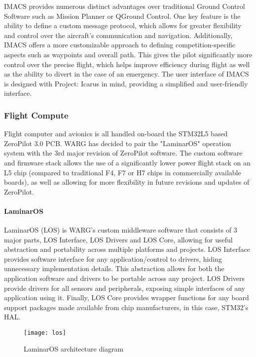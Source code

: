IMACS provides numerous distinct advantages over traditional Ground Control Software
such as Mission Planner or QGround Control. One key feature is the ability to define
a custom message protocol, which allows for greater flexibility and control over the
aircraft's communication and navigation. Additionally, IMACS offers a more customizable
approach to defining competition-specific aspects such as waypoints and overall path.
This gives the pilot significantly more control over the precise flight, which helps
improve efficiency during flight as well as the ability to divert in the case of
an emergency. The user interface of IMACS is designed with Project: Icarus in mind,
providing a simplified and user-friendly interface.

\subsubsection{Flight Compute}
\label{sec:flight-compute}

Flight computer and avionics is all handled on-board the STM32L5 based ZeroPilot 3.0
PCB. WARG has decided to pair the "LaminarOS" operation system with the 3rd major
revision of ZeroPilot software. The custom software and firmware stack allows
the use of a significantly lower power flight stack on an L5 chip (compared to traditional
F4, F7 or H7 chips in commercially available boards), as well as allowing for more 
flexibility in future revisions and updates of ZeroPilot.

\paragraph{LaminarOS}

LaminarOS (LOS) is WARG's custom middleware software that consists of 3 major parts,
LOS Interface, LOS Drivers and LOS Core, allowing for useful abstraction and
portability across multiple platforms and projects. LOS Interface provides software
interface for any application/control to drivers, hiding unnecessary implementation
details. This abstraction allows for both the application software and drivers to be
portable across any project. LOS Drivers provide drivers for all sensors and 
peripherals, exposing simple interfaces of any application using it. Finally, LOS Core
provides wrapper functions for any board support packages made available from chip
manufacturers, in this case, STM32's HAL.

\begin{figure}[H]
        \centering
        \texttt{[image: los]}
        \caption{LaminarOS architecture diagram}
\end{figure}

